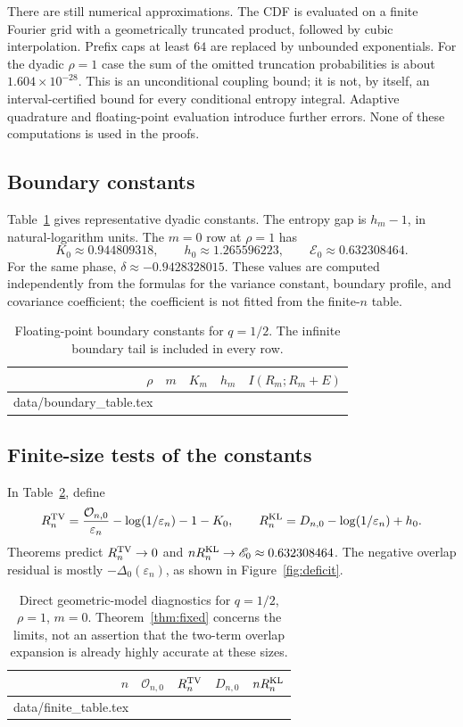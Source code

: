 \documentclass[11pt,a4paper]{article}
\makeatletter
\numberwithin{equation}{section}
\theoremstyle{definition}
\theoremstyle{remark}
\newcommand{\eps}{\varepsilon}
\newcommand{\ov}{\mathcal O}
\newcommand{\inputtable}[1]{\@@input#1 }
\makeatother
\begin{document}
There are still numerical approximations. The CDF is evaluated on a
finite Fourier grid with a geometrically truncated product, followed
by cubic interpolation. Prefix caps at least $64$ are replaced by
unbounded exponentials. For the dyadic $\rho=1$ case the sum of the
omitted truncation probabilities is about $1.604\times10^{-28}$.
This is an unconditional coupling bound; it is not, by itself, an
interval-certified bound for every conditional entropy integral.
Adaptive quadrature and floating-point evaluation introduce further
errors. None of these computations is used in the proofs.

\subsection{Boundary constants}
Table~\ref{tab:boundary} gives representative dyadic constants. The
entropy gap is $h_m-1$, in natural-logarithm units. The $m=0$ row at
$\rho=1$ has
\[
K_0\approx0.944809318,\qquad h_0\approx1.265596223,
\qquad \mathscr E_0\approx0.632308464.
\]
For the same phase, $\delta\approx-0.9428328015$. These values are
computed independently from the formulas for the variance constant,
boundary profile, and covariance coefficient; the coefficient is not
fitted from the finite-$n$ table.

\begin{table}[ht]
\centering\small
\begin{tabular}{@{}rr rrr@{}}
\toprule
$\rho$ & $m$ & $K_m$ & $h_m$ & $I(R_m;R_m+E)$\\
\midrule
\inputtable{data/boundary_table.tex}
\bottomrule
\end{tabular}
\caption{Floating-point boundary constants for $q=1/2$.
The infinite boundary tail is included in every row.}
\label{tab:boundary}
\end{table}

\subsection{Finite-size tests of the constants}
In Table~\ref{tab:finite}, define
\[
R^{\rm TV}_n=\frac{\ov_{n,0}}{\eps_n}
             -\log(1/\eps_n)-1-K_0,
\qquad
R^{\rm KL}_n=D_{n,0}-\log(1/\eps_n)+h_0.
\]
Theorems predict $R^{\rm TV}_n\to0$ and
$nR^{\rm KL}_n\to\mathscr E_0\approx0.632308464$.
The negative overlap residual is mostly $-\Delta_0(\eps_n)$, as
shown in Figure~\ref{fig:deficit}.

\begin{table}[ht]
\centering\small
\begin{tabular}{@{}r rrrr@{}}
\toprule
$n$ & $\ov_{n,0}$ & $R^{\rm TV}_n$ & $D_{n,0}$ & $nR^{\rm KL}_n$\\
\midrule
\inputtable{data/finite_table.tex}
\bottomrule
\end{tabular}
\caption{Direct geometric-model diagnostics for $q=1/2$, $\rho=1$, $m=0$.
Theorem~\ref{thm:fixed} concerns the limits, not an assertion that the
two-term overlap expansion is already highly accurate at these sizes.}
\label{tab:finite}
\end{table}
\end{document}

